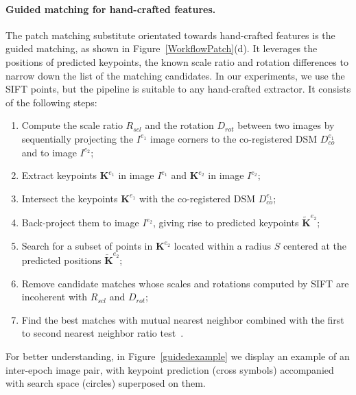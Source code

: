\paragraph{Guided matching for hand-crafted features.} 
The patch matching substitute orientated towards hand-crafted features is the guided matching, as shown in Figure~\ref{WorkflowPatch}(d). It leverages the positions of predicted keypoints, {the known scale ratio and rotation differences to narrow down the list of the matching candidates}. In our experiments, we use the SIFT points, but the pipeline is suitable to any hand-crafted extractor. 
It consists of the following steps:\\
\begin{enumerate}
	\item {Compute the scale ratio $R_{scl}$ and the rotation $D_{rot}$ between two images by sequentially projecting the $I^{e_1}$ image corners to the co-registered \ac{DSM} $D_{co}^{e_1}$ and to image $I^{e_2}$;} %
	\item Extract keypoints $\mathbf{K}^{e_1}$ in image $I^{e_1}$ and $\mathbf{K}^{e_2}$ in image $I^{e_2}$;
	\item Intersect the keypoints $\mathbf{K}^{e_1}$ with the co-registered \ac{DSM} $D_{co}^{e_1}$;
	\item Back-project them to image $I^{e_2}$, giving rise to predicted keypoints $\widetilde{\mathbf{K}}^{e_2}$;
	\item Search for a subset of points in $\mathbf{K}^{e_2}$ located within a radius $S$ centered at the predicted positions $\widetilde{\mathbf{K}}^{e_2}$;%
	\item Remove candidate matches whose scales and rotations computed by SIFT are incoherent with $R_{scl}$ and $D_{rot}$;%
	\item {Find the best matches with mutual nearest neighbor combined with the first to second nearest neighbor ratio test~\cite{lowe2004distinctive}.}
\end{enumerate}
For better understanding, in Figure~\ref{guidedexample} we display an example of an inter-epoch image pair, with keypoint prediction (cross symbols) accompanied with search space (circles) superposed on them.\\

